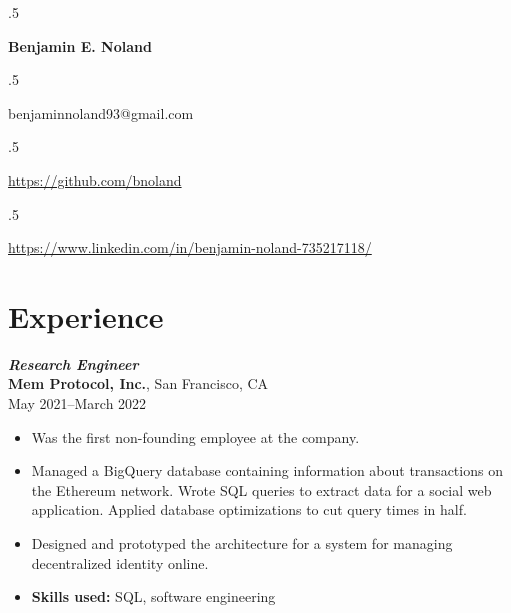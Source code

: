 \documentclass[letterpaper,12pt]{article}
\begin{document}
\moveleft.5\hoffset\centerline{\Large\bf Benjamin E. Noland}
\smallskip
\moveleft.5\hoffset\centerline{benjaminnoland93@gmail.com}
\moveleft.5\hoffset\centerline{\url{https://github.com/bnoland}}
\moveleft.5\hoffset\centerline{\url{https://www.linkedin.com/in/benjamin-noland-735217118/}}

\iffalse
\section*{Skills}
\begin{itemize}
	\item \textbf{Proficient:} Applied statistics and machine learning, R, 
	Python, C, Java, \LaTeX, Linux, Git, Google Cloud Platform
	\item \textbf{Experience:} Amazon Web Services, MATLAB, Stata, C++, CMake,
  JavaScript, HTML, CSS, PHP, MySQL, x86 assembly language, Rust
\end{itemize}
\fi

\section*{Experience}

\textit{\textbf{Research Engineer}} \\
\textbf{Mem Protocol, Inc.},
San Francisco, CA \\
May 2021--March 2022
\begin{itemize}
	\item Was the first non-founding employee at the company.
	\item Managed a BigQuery database containing information about transactions 
	on the Ethereum network. Wrote SQL queries to extract data for a social web 
	application. Applied database optimizations to cut query times in half.
	\item Designed and prototyped the architecture for a system for managing 
	decentralized identity online.
	\item \textbf{Skills used:} SQL, software engineering
\end{itemize}
\end{document}

